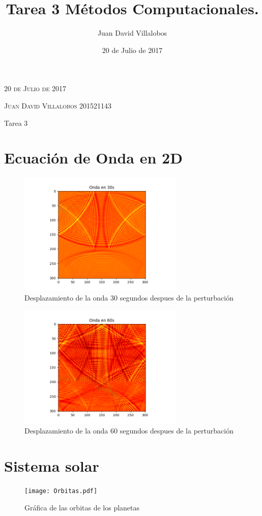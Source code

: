 \documentclass{article}
\author{Juan David Villalobos}
\date{20 de Julio de 2017}
\title{Tarea 3 Métodos Computacionales.}
\newcommand{\JournalIssue}[1]{%
		\hfill \textsc{20 de Julio de 2017}
		\par \normalsize \normalfont}
\newcommand{\NewsAuthor}[1]{%
			\hfill \textsc{Juan David Villalobos 201521143}
			\par \normalsize \normalfont}
\newcommand{\JournalName}[1]{%
		\begin{center}	
			\Huge \usefont{T1}{m}{n}
			#1%
		\end{center}	
		\par \normalsize \normalfont}
\begin{document}
\JournalIssue{1}
\NewsAuthor{}
\JournalName{Tarea 3}

\section{Ecuación de Onda en 2D}

\begin{figure}[h!]
\centering
\includegraphics[width=0.7\textwidth]{tiempo=30s.png}
\caption{Desplazamiento de la onda 30 segundos despues de la perturbación}
\end{figure}

\begin{figure}[h!]
\centering
\includegraphics[width=0.7\textwidth]{tiempo=60s.png}
\caption{Desplazamiento de la onda 60 segundos despues de la perturbación}
\end{figure}

\section{Sistema solar}

\begin{figure}[h!]
\centering
\texttt{[image: Orbitas.pdf]}
\caption{Gráfica de las orbitas de los planetas}
\end{figure}
\end{document}
